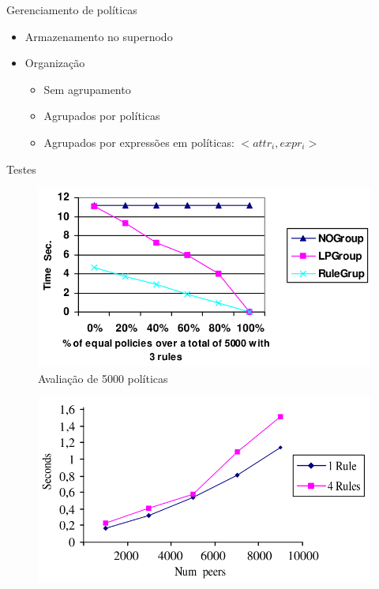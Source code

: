 \documentclass{beamer}
\begin{document}
  \begin{frame}{Gerenciamento de políticas}
   \begin{itemize}
    \item Armazenamento no supernodo
    \item Organização
    \begin{itemize}
     \item Sem agrupamento
     \item Agrupados por políticas
     \item Agrupados por expressões em políticas: $< attr_{i}, expr_{i} >$
    \end{itemize}

   \end{itemize}
  \end{frame}
  
  \begin{frame}{Testes}
  \begin{multicols}{2}
    \begin{figure}[H]
     \includegraphics[scale=0.2]{phera_fig3.png}
     \caption{Avaliação de 5000 políticas}
    \end{figure}
    \begin{figure}[H]
     \includegraphics[scale=0.2]{phera_fig4.png}
    \end{figure}
  \end{multicols}
  \end{frame}
  
\end{document}

